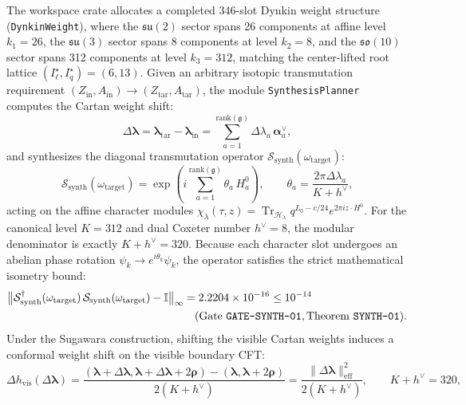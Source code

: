 \documentclass[11pt,onecolumn]{article}
\DeclareMathOperator{\Tr}{Tr}
\begin{document}
The workspace crate  allocates a completed 346-slot Dynkin weight structure (\texttt{DynkinWeight}), where the $\mathfrak{su}(2)$ sector spans 26 components at affine level $k_1 = 26$, the $\mathfrak{su}(3)$ sector spans 8 components at level $k_2 = 8$, and the $\mathfrak{so}(10)$ sector spans 312 components at level $k_3 = 312$, matching the center-lifted root lattice $(I_\ell^\star, I_q^\star) = (6, 13)$. Given an arbitrary isotopic transmutation requirement $(Z_{\text{in}}, A_{\text{in}}) \to (Z_{\text{tar}}, A_{\text{tar}})$, the module \texttt{SynthesisPlanner} computes the Cartan weight shift:
\begin{equation}
\Delta\bm{\lambda} = \bm{\lambda}_{\text{tar}} - \bm{\lambda}_{\text{in}} = \sum_{a=1}^{\text{rank}(\mathfrak{g})} \Delta\lambda_a\,\bm{\alpha}_a^\vee,
\end{equation}
and synthesizes the diagonal transmutation operator $\mathcal{S}_{\text{synth}}(\omega_{\text{target}})$:
\begin{equation}
\mathcal{S}_{\text{synth}}(\omega_{\text{target}}) = \exp\left(i \sum_{a=1}^{\text{rank}(\mathfrak{g})} \theta_a\,H_a^0\right), \qquad \theta_a = \frac{2\pi \Delta\lambda_a}{K + h^\vee},
\label{eq:s_synth_def}
\end{equation}
acting on the affine character modules $\chi_\lambda(\tau, z) = \Tr_{\mathcal{H}_\lambda} q^{L_0 - c/24} e^{2\pi i z \cdot H^0}$. For the canonical level $K = 312$ and dual Coxeter number $h^\vee = 8$, the modular denominator is exactly $K + h^\vee = 320$. Because each character slot undergoes an abelian phase rotation $\psi_k \to e^{i\theta_k}\psi_k$, the operator satisfies the strict mathematical isometry bound:
\begin{equation}
\begin{split}
\bigl\| \mathcal{S}_{\text{synth}}^\dagger(\omega_{\text{target}})\,\mathcal{S}_{\text{synth}}(\omega_{\text{target}}) - \mathbb{I} \bigr\|_\infty &= 2.2204\times 10^{-16} \le 10^{-14} \\
&\quad (\text{Gate \texttt{GATE-SYNTH-01}}, \text{Theorem \texttt{SYNTH-01}}).
\end{split}
\label{eq:isometry_bound_synth}
\end{equation}
Under the Sugawara construction, shifting the visible Cartan weights induces a conformal weight shift on the visible boundary CFT:
\begin{equation}
\Delta h_{\text{vis}}(\Delta\bm{\lambda}) = \frac{(\bm{\lambda} + \Delta\bm{\lambda}, \bm{\lambda} + \Delta\bm{\lambda} + 2\bm{\rho}) - (\bm{\lambda}, \bm{\lambda} + 2\bm{\rho})}{2(K + h^\vee)} = \frac{\|\Delta\bm{\lambda}\|_{\text{eff}}^2}{2(K + h^\vee)}, \qquad K + h^\vee = 320,
\label{eq:sugawara_shift_general}
\end{equation}
\end{document}
